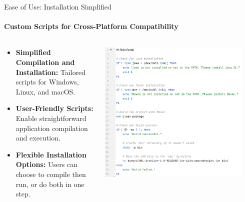 \documentclass[
    ngerman,%
    authorontitle=true,
]{bfhbeamer}
\begin{document}
	\begin{frame}{Ease of Use: Installation Simplified}
		\framesubtitle{Custom Scripts for Cross-Platform Compatibility}
		\begin{columns} %
			\begin{column}{0.6\textwidth} %
				\begin{itemize}
					\item \textbf{Simplified Compilation and Installation:} Tailored scripts for Windows, Linux, and macOS.
					\item \textbf{User-Friendly Scripts:} Enable straightforward application compilation and execution.
					\item \textbf{Flexible Installation Options:} Users can choose to compile then run, or do both in one step.
				\end{itemize}
			\end{column}
			\begin{column}{0.4\textwidth} %
				\begin{center}
					\includegraphics[width=0.9\textwidth]{pictures/final_presentation/build_script.png}
				\end{center}
			\end{column}
		\end{columns} %
	\end{frame}
\end{document}
